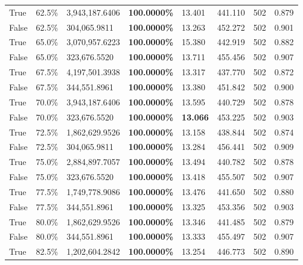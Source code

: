 \begin{table}[H]
\begin{tabular}{lllrllll}
\cline{1-8}
True & 62.5\% & 3,943,187.6406 & \bfseries \color{red} 100.0000\% & 13.401 & 441.110 & 502 & 0.879 \\
\cline{1-8}
False & 62.5\% & \color{red} 304,065.9811 & \bfseries \color{red} 100.0000\% & 13.263 & 452.272 & 502 & 0.901 \\
\cline{1-8}
True & 65.0\% & 3,070,957.6223 & \bfseries \color{red} 100.0000\% & 15.380 & 442.919 & 502 & 0.882 \\
\cline{1-8}
False & 65.0\% & 323,676.5520 & \bfseries \color{red} 100.0000\% & 13.711 & 455.456 & 502 & 0.907 \\
\cline{1-8}
True & 67.5\% & 4,197,501.3938 & \bfseries \color{red} 100.0000\% & 13.317 & 437.770 & 502 & 0.872 \\
\cline{1-8}
False & 67.5\% & 344,551.8961 & \bfseries \color{red} 100.0000\% & 13.380 & 451.842 & 502 & 0.900 \\
\cline{1-8}
True & 70.0\% & 3,943,187.6406 & \bfseries \color{red} 100.0000\% & 13.595 & 440.729 & 502 & 0.878 \\
\cline{1-8}
False & 70.0\% & 323,676.5520 & \bfseries \color{red} 100.0000\% & \bfseries \color{red} 13.066 & 453.225 & 502 & 0.903 \\
\cline{1-8}
True & 72.5\% & 1,862,629.9526 & \bfseries \color{red} 100.0000\% & 13.158 & 438.844 & 502 & 0.874 \\
\cline{1-8}
False & 72.5\% & \color{red} 304,065.9811 & \bfseries \color{red} 100.0000\% & 13.284 & 456.441 & 502 & 0.909 \\
\cline{1-8}
True & 75.0\% & 2,884,897.7057 & \bfseries \color{red} 100.0000\% & 13.494 & 440.782 & 502 & 0.878 \\
\cline{1-8}
False & 75.0\% & 323,676.5520 & \bfseries \color{red} 100.0000\% & 13.418 & 455.507 & 502 & 0.907 \\
\cline{1-8}
True & 77.5\% & 1,749,778.9086 & \bfseries \color{red} 100.0000\% & 13.476 & 441.650 & 502 & 0.880 \\
\cline{1-8}
False & 77.5\% & 344,551.8961 & \bfseries \color{red} 100.0000\% & 13.325 & 453.356 & 502 & 0.903 \\
\cline{1-8}
True & 80.0\% & 1,862,629.9526 & \bfseries \color{red} 100.0000\% & 13.346 & 441.485 & 502 & 0.879 \\
\cline{1-8}
False & 80.0\% & 344,551.8961 & \bfseries \color{red} 100.0000\% & 13.333 & 455.497 & 502 & 0.907 \\
\cline{1-8}
True & 82.5\% & 1,202,604.2842 & \bfseries \color{red} 100.0000\% & 13.254 & 446.773 & 502 & 0.890 \\

\end{tabular}
\end{table}
